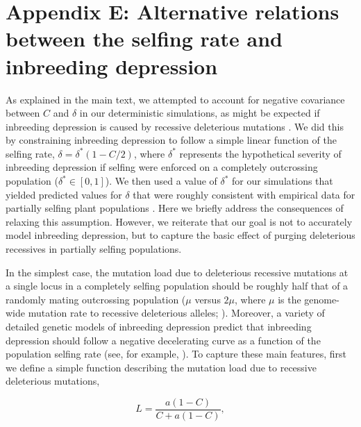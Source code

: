 \documentclass{article}
\begin{document}
\FloatBarrier

\section*{Appendix E: Alternative relations between the selfing rate and inbreeding depression}
\renewcommand{\theequation}{E\arabic{equation}}
\setcounter{equation}{0}
\renewcommand{\thefigure}{E\arabic{figure}}
\setcounter{figure}{0}

As explained in the main text, we attempted to account for negative covariance between $C$ and $\delta$ in our deterministic simulations, as might be expected if inbreeding depression is caused by recessive deleterious mutations \citep{Charlesworth1987, Charlesworth2009}. We did this by constraining inbreeding depression to follow a simple linear function of the selfing rate, $\delta = \delta^\ast(1 - C/2)$, where $\delta^\ast$ represents the hypothetical severity of inbreeding depression if selfing were enforced on a completely outcrossing population ($\delta^\ast \in [0,1]$). We then used a value of $\delta^{\ast}$ for our simulations that yielded predicted values for $\delta$ that were roughly consistent with empirical data for partially selfing plant populations \citep{HusbandSchemske1996}. Here we briefly address the consequences of relaxing this assumption. However, we reiterate that our goal is not to accurately model inbreeding depression, but to capture the basic effect of purging deleterious recessives in partially selfing populations. 

In the simplest case, the mutation load due to deleterious recessive mutations at a single locus in a completely selfing population should be roughly half that of a randomly mating outcrossing population ($\mu$ versus $2 \mu$, where $\mu$ is the genome-wide mutation rate to recessive deleterious alleles; \citealt{OhtaCockerham1974}). Moreover, a variety of detailed genetic models of inbreeding depression predict that inbreeding depression should follow a negative decelerating curve as a function of the population selfing rate (see, for example, \citealt{OhtaCockerham1974, LandeSchemske1985, Charlesworth1985, Garcia-Dorado2017, LandePorcher2017}). To capture these main features, first we define a simple function describing the mutation load due to recessive deleterious mutations,

\begin{equation}\label{eq:Load}
    L = \frac{a (1 - C)}{C + a (1 - C)},
\end{equation}
\end{document}
